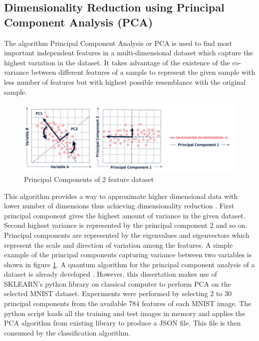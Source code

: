 \documentclass[english,a4paper,11pt,oneside,onecolumn]{book}
\begin{document}
\subsection{Dimensionality Reduction using Principal Component Analysis (PCA)}
The algorithm Principal Component Analysis or PCA \cite{firmin_2019_tidying} is used to find most important independent features in a multi-dimensional dataset which capture the highest variation in the dataset. It takes advantage of the existence of the co-variance between different features of a sample to represent the given sample with less number of features but with highest possible resemblance with the original sample. 

\begin{figure}[H]
    \centering
    \includegraphics{Images/PCA.PNG}
    \caption{Principal Components of 2 feature dataset}
    \label{fig:pca}
\end{figure}

This algorithm provides a way to approximate higher dimensional data with lower number of dimensions thus achieving dimensionality reduction \cite{gorban_2007_principal}. First principal component gives the highest amount of variance in the given dataset. Second highest variance is represented by the principal component 2 and so on. Principal components are represented by the eigenvalues and eigenvectors which represent the scale and direction of variation among the features. A simple example of the principal components capturing variance between two variables is shown in figure \ref{fig:pca}. A quantum algorithm for the principal component analysis of a dataset is already developed \cite{lloyd_2014_quantum}. However, this dissertation makes use of SKLEARN's python library on classical computer to perform PCA on the selected MNIST dataset. Experiments were performed by selecting 2 to 30 principal components from the available 784 features of each MNIST image. The python script loads all the training and test images in memory and applies the PCA algorithm from existing library to produce a JSON file. This file is then consumed by the classification algorithm.
\end{document}
